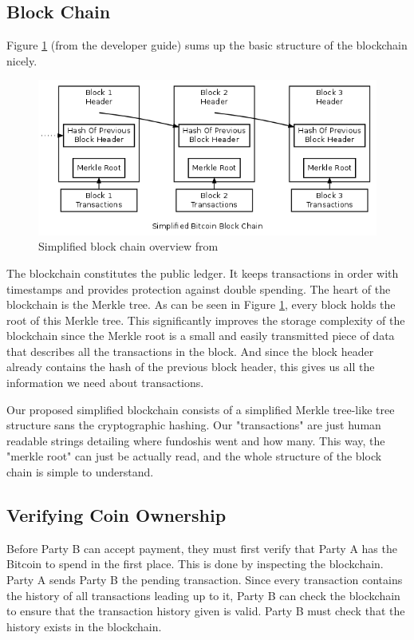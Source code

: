 \documentclass[12pt]{article}
\begin{document}
\subsection{Block Chain}\label{blockchain}
Figure \ref{figblockchain} (from the developer guide) sums up the basic structure of the blockchain nicely. 

\begin{figure}[h!]\label{figblockchain}
	\centering
	\includegraphics[scale=0.5]{en-blockchain-overview.png}
	\caption{Simplified block chain overview from \cite{dev:guide}}
\end{figure}

The blockchain constitutes the public ledger. It keeps transactions in order with timestamps and provides protection
against double spending. The heart of the blockchain is the Merkle tree. As can be seen in Figure \ref{figblockchain},
every block holds the root of this Merkle tree. This significantly improves the storage complexity of the blockchain since
the Merkle root is a small and easily transmitted piece of data that describes all the transactions in the block. And since
the block header already contains the hash of the previous block header, this gives us all the information we need about transactions. 

Our proposed simplified blockchain consists of a simplified Merkle tree-like tree structure sans the cryptographic hashing. Our
"transactions" are just human readable strings detailing where fundoshis went and how many.
This way, the "merkle root" can just be actually read, and the whole structure of the block chain is simple to understand.

\subsection{Verifying Coin Ownership}
Before Party B can accept payment, they must first verify that Party A has the Bitcoin to spend in the first
place. This is done by inspecting the blockchain. Party A sends Party B the pending transaction. Since every
transaction contains the history of all transactions leading up to it, Party B can check the blockchain
to ensure that the transaction history given is valid. Party B must check that the history
exists in the blockchain.
\end{document}
